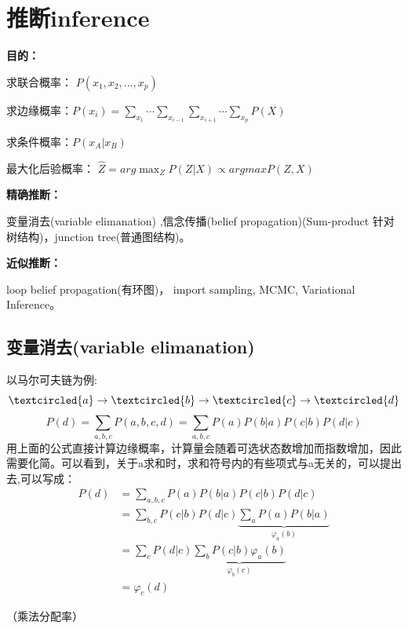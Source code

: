 \documentclass[UTF8]{ctexart} %
\begin{document}
	\section{推断inference}
			\textbf{目的：}
			
			求联合概率： $P(x_1,x_2,...,x_p)$
			
			求边缘概率：$P(x_i) = \sum_{x_1}\cdots\sum_{x_{i-1}}\sum_{x_{i+1}}\cdots\sum_{x_p}P(X)$
			
			求条件概率：$P(x_A|x_B)$
			
			最大化后验概率： $\hat{Z}=arg\max_{Z}P(Z|X) \propto argmaxP(Z,X)$
			
			\textbf{精确推断：}
			
			变量消去(variable elimanation) ,信念传播(belief propagation)(Sum-product 针对树结构)，junction tree(普通图结构)。
			
			\textbf{近似推断：}
			
			loop belief propagation(有环图)， import sampling, MCMC, Variational Inference。
		\subsection{变量消去(variable elimanation)}
			以马尔可夫链为例:
			\[\textcircled{a}\rightarrow\textcircled{b}\rightarrow\textcircled{c}\rightarrow\textcircled{d}\]
			\[P(d) = \sum_{a,b,c}P(a,b,c,d) = \sum_{a,b,c}P(a)P(b|a)P(c|b)P(d|c)\]
			用上面的公式直接计算边缘概率，计算量会随着可选状态数增加而指数增加，因此需要化简。可以看到，关于a求和时，求和符号内的有些项式与a无关的，可以提出去,可以写成：
			\[\begin{aligned}
			P(d) &=  \sum_{a,b,c}P(a)P(b|a)P(c|b)P(d|c)\\
			&= \sum_{b,c}P(c|b)P(d|c)\underbrace{\sum_aP(a)P(b|a)}_{\varphi_a(b)}\\
			&= \sum_cP(d|c)\underbrace{\sum_bP(c|b)\varphi_a(b)}_{\varphi_b(c)}\\
			&= \varphi_c(d)
			\end{aligned}\]
			
			（乘法分配率）
			
\end{document}
